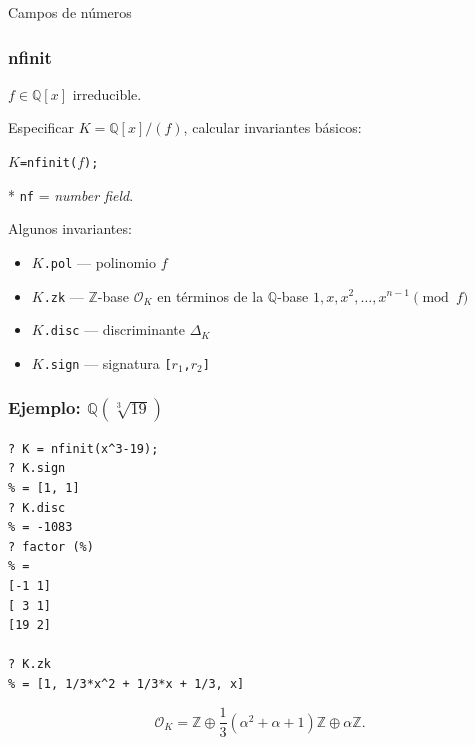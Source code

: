 \documentclass{beamer}
\newcommand{\ZZ}{\mathbb{Z}}
\newcommand{\QQ}{\mathbb{Q}}
\renewcommand{\O}{\mathcal{O}}
\begin{document}

\begin{frame}[plain]
  \headingfont

  \begin{center}
    {\huge Campos de números}
  \end{center}
\end{frame}


\begin{frame}[fragile]
  \frametitle{nfinit}

  $f \in \QQ [x]$ irreducible.

  Especificar $K = \QQ[x]/(f)$, calcular invariantes básicos:

  \begin{center}
    \texttt{$K$=nfinit($f$);}
  \end{center}

  \vspace{\fill}

  * \texttt{nf} = \emph{number field}.

  \vspace{\fill}

  Algunos invariantes:
  \begin{itemize}
  \item \texttt{$K$.pol} --- polinomio $f$

  \item \texttt{$K$.zk} --- $\ZZ$-base $\O_K$ en términos de la $\QQ$-base
    $1,x,x^2,\ldots,x^{n-1} \pmod{f}$

  \item \texttt{$K$.disc} --- discriminante $\Delta_K$

  \item \texttt{$K$.sign} --- signatura \texttt{[$r_1$,$r_2$]}
  \end{itemize}
\end{frame}


\begin{frame}[fragile]
  \frametitle{Ejemplo: $\QQ (\sqrt[3]{19})$}

  \begin{shaded}\footnotesize
\begin{verbatim}
? K = nfinit(x^3-19);
? K.sign
% = [1, 1]
? K.disc 
% = -1083
? factor (%)
% = 
[-1 1]
[ 3 1]
[19 2]

? K.zk
% = [1, 1/3*x^2 + 1/3*x + 1/3, x]
\end{verbatim}
  \end{shaded}

  $$\O_K = \ZZ \oplus \frac{1}{3} (\alpha^2 + \alpha + 1) \ZZ \oplus \alpha \ZZ.$$
\end{frame}
\end{document}
